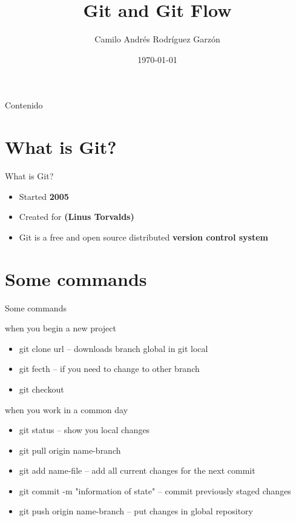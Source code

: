 \documentclass{beamer}
\title[GIT]{Git and Git Flow}
\author{Camilo Andrés Rodríguez Garzón}
\institute{Universidad EAFIT}
\date{\today}
\begin{document}
\begin{frame}
  \titlepage
\end{frame}

\begin{frame}{Contenido}
  \tableofcontents
\end{frame}

\section{What is Git?}

\begin{frame}{What is Git?}
\begin{itemize}
\item Started \textbf{2005}
\item Created for \textbf{(Linus Torvalds)}
\item Git is a free and open source distributed \textbf{version control system}
\end{itemize}

\end{frame}

\section{Some commands}

\begin{frame}{Some commands}

\begin{block}{when you begin a new project}
\begin{itemize}
\item git clone url -- downloads branch global in git local
\item git fecth -- if you need to change to other branch		
\item git checkout 
\end{itemize}
\end{block}

\begin{block}{when you work in a common day}
\begin{itemize}
\item git status -- show you local changes
\item git pull origin name-branch 					
\item git add name-file --	add all current changes for the next commit
\item git commit -m "information of state" --	commit previously staged changes
\item git push origin name-branch --	put changes in global repository
\end{itemize}
\end{block}

\end{frame}
\end{document}
